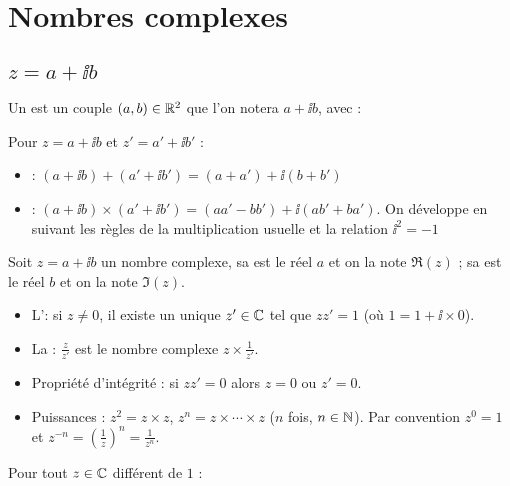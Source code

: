 \documentclass[10pt,class=article,crop=false]{standalone}
\begin{document}
\section{Nombres complexes}

\begin{multicols}{2}

\subsection{$z = a +\ii b$}

Un  est un couple $(a, b) \in \mathbb{R}^2$ que l'on notera $a + \ii b$, avec :

Pour $z = a + \ii b$ et $z' = a' + \ii b'$ :
\begin{itemize}
	\item {} : $(a + \ii b) + (a' + \ii b') =
	(a + a') + \ii  (b + b')$
	\item {} : $(a + \ii b) \times (a' + \ii b')
	= (aa' - bb') + \ii  (ab' + ba')$. On développe en suivant les règles de la multiplication usuelle 
	et la relation $\ii ^2 = - 1$
\end{itemize}	
Soit $z = a + \ii b$ un nombre complexe, sa  est le réel $a$ et on
la note $\Re(z)$ ;
sa  est le réel $b$ et on la note $\Im(z)$.

\begin{itemize}
	\item L': si $z \neq 0$, il existe un unique $z' \in \mathbb{C}$ tel
	que $zz' = 1$ (o\`u $1 = 1 + \ii  \times 0$).
	\item La  : $\frac{z}{z'}$ est le nombre complexe $z \times \frac{1}{z'}$.
	
	\item Propriété d'intégrité : si $zz' = 0$ alors $z = 0$ ou $z' = 0$.
	
	\item Puissances : $z^2 = z \times z$, $z^n = z \times \cdots \times z$ ($n$
	fois, $n\in \mathbb{N}$). Par convention $z^0 = 1$ et $z^{- n} = \left( \frac{1}{z} \right)^n = \frac{1}{z^n}$.
\end{itemize}

\begin{proposition}
	\label{prop:somme}
	Pour tout $z \in \mathbb{C}$ différent de $1$ :
\end{proposition}



\end{multicols}
\end{document}

